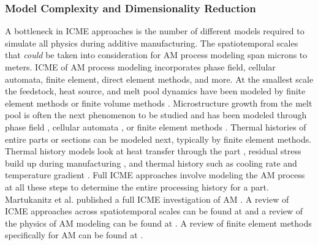 \subsubsection{Model Complexity and Dimensionality Reduction}
A bottleneck in ICME approaches is the number of different models required to simulate all physics during additive manufacturing. The spatiotemporal scales that \textit{could} be taken into consideration for AM process modeling span microns to meters. ICME of AM process modeling incorporates phase field, cellular automata, finite element, direct element methods, and more. At the smallest scale the feedstock, heat source, and melt pool dynamics have been modeled by finite element methods \cite{Toyserkani2004, Khairallah2016, Manvatkar2014} or finite  volume methods \cite{Dai2014}. Microstructure growth from the melt pool is often the next phenomenon to be studied and has been modeled through phase field \cite{Chen2002, Gong2015, Kundin2015, Sahoo2016}, cellular automata \cite{Tan2011}, or finite element methods \cite{Nie2014}. Thermal histories of entire parts or sections can be modeled next, typically by finite element methods. Thermal history models look at heat transfer through the part \cite{Michaleris2014}, residual stress build up during manufacturing \cite{Pal2014, Ding2011}, and thermal history such as cooling rate and temperature gradient \cite{Li2014, Raghavan2016}. Full ICME approaches involve modeling the AM process at all these steps to determine the entire processing history for a part. Martukanitz et al. published a full ICME investigation of AM \cite{Martukanitz2014}. A review of ICME approaches across spatiotemporal scales can be found at \cite{Francois2017} and a review of the physics of AM modeling can be found at \cite{King2015a}. A review of finite element methods specifically for AM can be found at \cite{Gouge2018}. 

